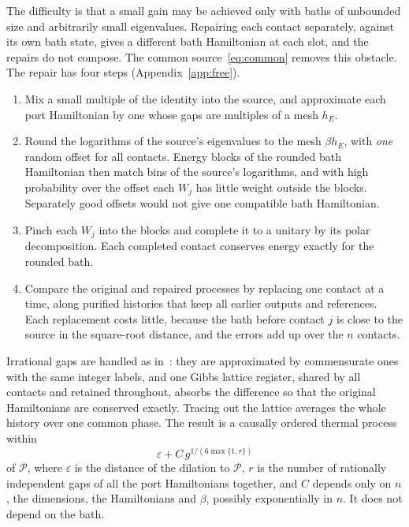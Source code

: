 \documentclass[11pt]{article}
\theoremstyle{definition}
\theoremstyle{remark}
\newcommand{\Pp}{\mathcal P}
\begin{document}
The difficulty is that a small gain may be achieved only with baths of unbounded size and arbitrarily small eigenvalues. Repairing each contact separately, against its own bath state, gives a different bath Hamiltonian at each slot, and the repairs do not compose. The common source~\eqref{eq:common} removes this obstacle. The repair has four steps (Appendix~\ref{app:free}).
\begin{enumerate}[label=(\roman*)]
\item Mix a small multiple of the identity into the source, and approximate each port Hamiltonian by one whose gaps are multiples of a mesh $h_E$.
\item Round the logarithms of the source's eigenvalues to the mesh $\beta h_E$, with \emph{one} random offset for all contacts. Energy blocks of the rounded bath Hamiltonian then match bins of the source's logarithms, and with high probability over the offset each $W_j$ has little weight outside the blocks. Separately good offsets would not give one compatible bath Hamiltonian.
\item Pinch each $W_j$ into the blocks and complete it to a unitary by its polar decomposition. Each completed contact conserves energy exactly for the rounded bath.
\item Compare the original and repaired processes by replacing one contact at a time, along purified histories that keep all earlier outputs and references. Each replacement costs little, because the bath before contact $j$ is close to the source in the square-root distance, and the errors add up over the $n$ contacts.
\end{enumerate}
Irrational gaps are handled as in~\cite{SaveWork}: they are approximated by commensurate ones with the same integer labels, and one Gibbs lattice register, shared by all contacts and retained throughout, absorbs the difference so that the original Hamiltonians are conserved exactly. Tracing out the lattice averages the whole history over one common phase. The result is a causally ordered thermal process within
\begin{equation}\label{eq:modulus}
\varepsilon+C\,g^{1/(6\max\{1,r\})}
\end{equation}
of $\Pp$, where $\varepsilon$ is the distance of the dilation to $\Pp$, $r$ is the number of rationally independent gaps of all the port Hamiltonians together, and $C$ depends only on $n$, the dimensions, the Hamiltonians and $\beta$, possibly exponentially in $n$. It does not depend on the bath.
\end{document}
